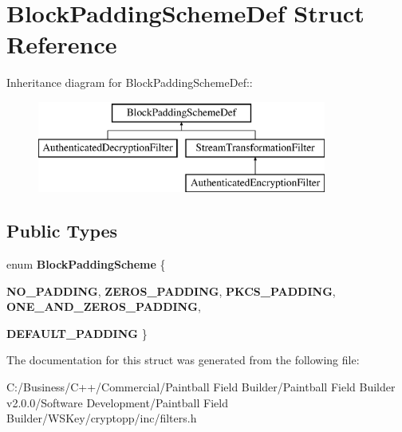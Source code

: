 \hypertarget{struct_block_padding_scheme_def}{
\section{BlockPaddingSchemeDef Struct Reference}
\label{struct_block_padding_scheme_def}
}
Inheritance diagram for BlockPaddingSchemeDef::\begin{figure}[H]
\begin{center}
\leavevmode
\includegraphics[height=3cm]{struct_block_padding_scheme_def}
\end{center}
\end{figure}
\subsection*{Public Types}
\begin{DoxyCompactItemize}
\item 
enum {\bfseries BlockPaddingScheme} \{ \par
{\bfseries NO\_\-PADDING}, 
{\bfseries ZEROS\_\-PADDING}, 
{\bfseries PKCS\_\-PADDING}, 
{\bfseries ONE\_\-AND\_\-ZEROS\_\-PADDING}, 
\par
{\bfseries DEFAULT\_\-PADDING}
 \}
\end{DoxyCompactItemize}


The documentation for this struct was generated from the following file:\begin{DoxyCompactItemize}
\item 
C:/Business/C++/Commercial/Paintball Field Builder/Paintball Field Builder v2.0.0/Software Development/Paintball Field Builder/WSKey/cryptopp/inc/filters.h\end{DoxyCompactItemize}
